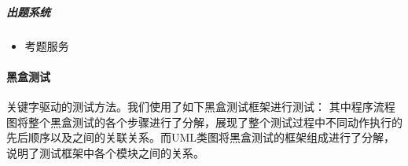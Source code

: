 \documentclass[hyperref, a4paper]{ctexart}
\providecommand{\tightlist}{%
  \setlength{\itemsep}{0pt}\setlength{\parskip}{0pt}}
\let\oldparagraph\paragraph
\renewcommand{\paragraph}[1]{\oldparagraph{#1}\mbox{}}
\let\oldsubparagraph\subparagraph
\renewcommand{\subparagraph}[1]{\oldsubparagraph{#1}\mbox{}}
\begin{document}
\hypertarget{ux51faux9898ux7cfbux7edf-2}{%
\subparagraph{出题系统}\label{ux51faux9898ux7cfbux7edf-2}}

\begin{itemize}
\tightlist
\item
  考题服务
\end{itemize}

\hypertarget{ux9ed1ux76d2ux6d4bux8bd5}{%
\paragraph{黑盒测试}\label{ux9ed1ux76d2ux6d4bux8bd5}}

关键字驱动的测试方法。我们使用了如下黑盒测试框架进行测试：
其中程序流程图将整个黑盒测试的各个步骤进行了分解，展现了整个测试过程中不同动作执行的先后顺序以及之间的关联关系。而UML类图将黑盒测试的框架组成进行了分解，说明了测试框架中各个模块之间的关系。
\end{document}
